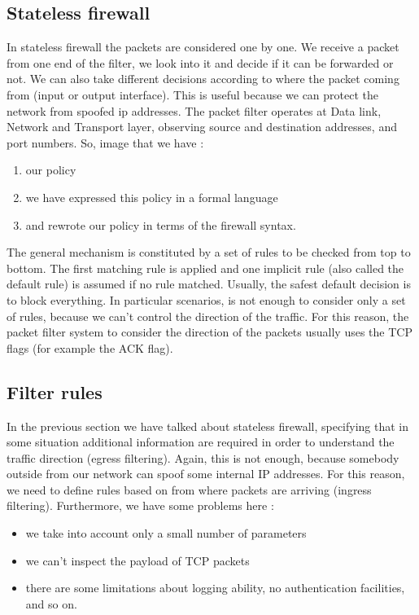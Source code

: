 \documentclass[11pt]{article}
\begin{document}
\subsection{Stateless firewall}
In stateless firewall the packets are considered one by one. We receive a packet from one end of the filter, we look into it and decide if it can be forwarded or not. We can also take different decisions according to where the packet coming from (input or output interface). This is useful because we can protect the network from spoofed ip addresses. The packet filter operates at Data link, Network and Transport layer, observing source and destination addresses, and port numbers. So, image that we have :
\begin{enumerate}
\item our policy
\item we have expressed this policy in a formal language
\item and rewrote our policy in terms of the firewall syntax.
\end{enumerate}
The general mechanism is constituted by a set of rules to be checked from top to bottom. The first matching rule is applied and one implicit rule (also called the default rule) is assumed if no rule matched. Usually, the safest default decision is to block everything. In particular scenarios, is not enough to consider only a set of rules, because we can't control the direction of the traffic. For this reason, the packet filter system to consider the direction of the packets usually uses the TCP flags (for example the ACK flag).
\subsection{Filter rules}
In the previous section we have talked about stateless firewall, specifying that in some situation additional information are required in order to understand the traffic direction (egress filtering). Again, this is not enough, because somebody outside from our network can spoof some internal IP addresses. For this reason, we need to define rules based on from where packets are arriving (ingress filtering). Furthermore, we have some problems here : 
\begin{itemize}
\item we take into account only a small number of parameters
\item we can't inspect the payload of TCP packets
\item there are some limitations about logging ability, no authentication facilities, and so on.
\end{itemize}
\end{document}
